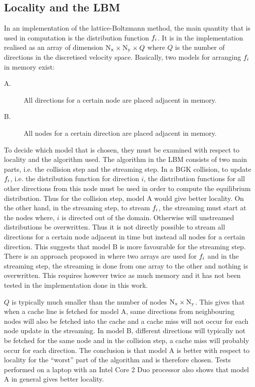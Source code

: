 
\subsection{Locality and the LBM}\label{sec:hpc:loc_lbm}
In an implementation of the lattice-Boltzmann method, the main
quantity that is used in computation is the distribution
function $f_i$. It is in the implementation realised as an array of
dimension $\mathrm{N_x} \times \mathrm{N_y} \times Q$ where $Q$ is the number of
directions in the discretised velocity space. Basically, two models
for arranging $f_i$ in memory exist:

\begin{description}
  \item[A.] All directions for a certain node are placed adjacent in
    memory.
  \item[B.] All nodes for a certain direction are placed adjacent in
    memory.
\end{description}

To decide which model that is chosen, they must be examined with
respect to locality and the algorithm used. The algorithm in the LBM
consists of two main parts, i.e. the collision step and the streaming
step. In a BGK collision, to update $f_i$, i.e. the distribution
function for direction $i$, the distribution functions for all other
directions from this node must be used in order to compute the
equilibrium distribution. Thus for the collision step, model A would
give better locality. On the other hand, in the streaming step, to
stream $f_i$, the streaming must start at the nodes where, $i$ is
directed out of the domain. Otherwise will unstreamed distributions be
overwritten. Thus it is not directly possible to stream all directions
for a certain node adjacent in time but instead all nodes for a
certain direction. This suggests that model B is more favourable for
the streaming step. There is an approach proposed in \cite{mikael}
where two arrays are used for $f_i$ and in the streaming step, the
streaming is done from one array to the other and nothing is
overwritten. This requires however twice as much memory and it has not
been tested in the implementation done in this work.

$Q$ is typically much smaller than the number of nodes $\mathrm{N_x} \times
\mathrm{N_y}$. This gives that when a cache line is fetched for model A, same
directions from neighbouring nodes will also be fetched into the cache
and a cache miss will not occur for each node update in the
streaming. In model B, different directions will typically not be
fetched for the same node and in the collision step, a cache miss will
probably occur for each direction. The conclusion is that model A is
better with respect to locality for the ``worst'' part of the
algorithm and is therefore chosen. Tests performed on a laptop with
an Intel Core 2 Duo processor also shows that model A in general gives
better locality.

